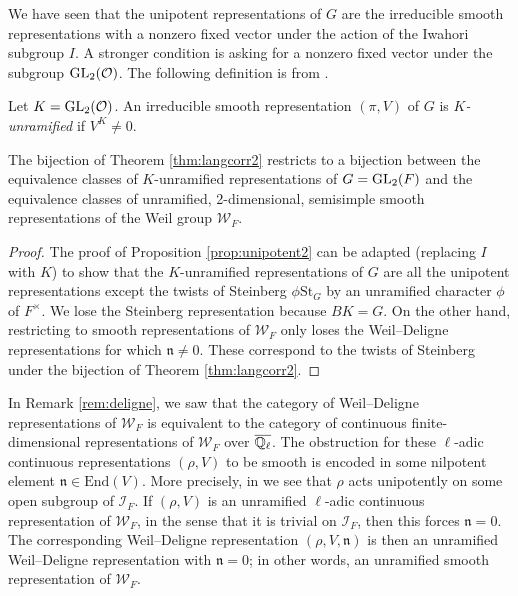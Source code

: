 We have seen that the unipotent representations of $G$ are the irreducible smooth representations with a nonzero fixed vector under the action of the Iwahori subgroup $I$. A stronger condition is asking for a nonzero fixed vector under the subgroup $\mathrm{GL}_2(\mathcal{O})$. The following definition is from \cite[Definition 7.1]{GH1}.

\begin{defn}
    Let $K=\mathrm{GL}_2(\mathcal{O})$. An irreducible smooth representation $(\pi,V)$ of $G$ is \textit{$K$-unramified} if $V^K \neq 0$.
\end{defn}

\begin{cor}
    The bijection of Theorem \ref{thm:langcorr2} restricts to a bijection between the equivalence classes of $K$-unramified representations of $G=\mathrm{GL}_2(F)$ and the equivalence classes of unramified, 2-dimensional, semisimple smooth representations of the Weil group $\mathcal W_F$.    
\end{cor}
\begin{proof}
    The proof of Proposition \ref{prop:unipotent2} can be adapted (replacing $I$ with $K$) to show that the $K$-unramified representations of $G$ are all the unipotent representations except the twists of Steinberg $\phi \mathrm{St}_G$ by an unramified character $\phi$ of $F^\times$. We lose the Steinberg representation because $BK=G$. On the other hand, restricting to smooth representations of $\mathcal W_F$ only loses the Weil--Deligne representations for which $\mathfrak n \neq 0$. These correspond to the twists of Steinberg under the bijection of Theorem \ref{thm:langcorr2}.
\end{proof}
\begin{rem}
    In Remark \ref{rem:deligne}, we saw that the category of Weil--Deligne representations of $\mathcal W_F$ is equivalent to the category of continuous finite-dimensional representations of $\mathcal W_F$ over $\overline{\mathbb{Q}_\ell}$. The obstruction for these $\ell$-adic continuous representations $(\rho,V)$ to be smooth is encoded in some nilpotent element $\mathfrak n \in \mathrm{End}(V)$. More precisely, in \cite[Theorem 32.5]{BH1} we see that $\rho$ acts unipotently on some open subgroup of $\mathcal I_F$. If $(\rho,V)$ is an unramified $\ell$-adic continuous representation of $\mathcal W_F$, in the sense that it is trivial on $\mathcal I_F$, then this forces $\mathfrak n = 0$. The corresponding Weil--Deligne representation $(\rho,V,\mathfrak n)$ is then an unramified Weil--Deligne representation with $\mathfrak n=0$; in other words, an unramified smooth representation of $\mathcal W_F$.
\end{rem}



